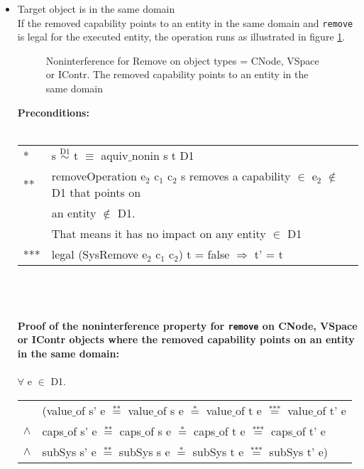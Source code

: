 \begin{itemize}
\item Target object is in the same domain \\
If the removed capability points to an entity in the same domain and  \texttt{remove} is legal for the executed entity, the operation runs as illustrated in figure \ref{fig:RemoveCNode}.
\begin{flushleft}
\begin{figure}[H]
\caption{Noninterference for Remove on object types = CNode, VSpace or IContr. The removed capability points to an entity in the same domain}
\label{fig:RemoveCNode}
\end{figure}
\end{flushleft}
\textbf{Preconditions:} \\ \\
\begin{tabular}{ll}
* & s $\overset{\text{D1}}{\sim}$ t $\equiv$ aquiv$\_$nonin s t D1	\\ 
** & removeOperation e$_2$ c$_1$ c$_2$ s removes a capability $\in$ e$_2$ $\notin$ D1 that points on \\
& an entity $\notin$ D1. \\
& That means it has no impact on any entity $\in$ D1 \\ 
*** & legal (SysRemove e$_2$ c$_1$ c$_2$) t = false $\Rightarrow$ t' = t
\end{tabular} \\ \\ \\
\textbf{Proof of the noninterference property for \texttt{remove} on CNode, VSpace or IContr objects where the removed capability points on an entity in the same domain:}\\ \\
$\forall$ e $\in$ D1. \\
\begin{tabular}{ll}
& (value$\_$of s' e $\overset{\text{**}}{=}$ value$\_$of s e $\overset{\text{*}}{=}$ value$\_$of t e $\overset{\text{***}}{=}$ value$\_$of t' e \\
$\wedge$ & caps$\_$of s' e $\overset{\text{**}}{=}$ caps$\_$of s e $\overset{\text{*}}{=}$ caps$\_$of t e $\overset{\text{***}}{=}$ caps$\_$of t' e \\
$\wedge$ & subSys s' e $\overset{\text{**}}{=}$ subSys s e $\overset{\text{*}}{=}$ subSys t e $\overset{\text{***}}{=}$ subSys t' e)
\end{tabular} \\

\end{itemize}
